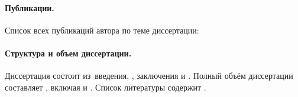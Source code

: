 \paragraph*{Публикации.} Список всех публикаций автора по теме диссертации:
\begin{refsection}
\nocite{*}
\printbibliography[
    keyword=own,
    heading=none,
    resetnumbers=true
]
\end{refsection}



\paragraph*{Структура и объем диссертации. }
Диссертация состоит из~введения,
,
заключения и
.
Полный объём диссертации составляет
, включая
 и
.
Список литературы содержит
.